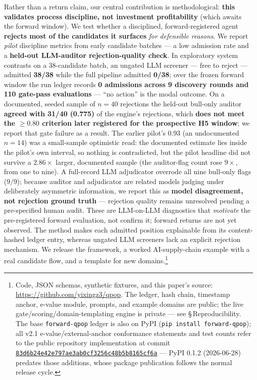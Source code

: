 \documentclass[11pt]{article}
\renewenvironment{abstract}{\begin{center}\bfseries\abstractname\end{center}\par\noindent\ignorespaces}{\par\medskip}
\begin{document}
\begin{abstract}
Rather than a return claim, our central contribution is methodological: \textbf{this validates
process discipline, not investment profitability} (which awaits the forward window). We test whether
a disciplined, forward-registered agent \textbf{rejects most of the candidates it surfaces}
\emph{for defensible reasons}. We report \emph{pilot} discipline metrics from early candidate batches
--- a low admission rate and a \textbf{held-out LLM-auditor rejection-quality check}. In exploratory
system contrasts on a 38-candidate batch, an ungated LLM screener --- free to reject --- admitted
\textbf{38/38} while the full pipeline admitted \textbf{0/38}; over the frozen forward window the
run ledger records \textbf{0 admissions across 9 discovery rounds and 110 gate-pass evaluations}
--- ``no action'' is the modal outcome. On a documented,
seeded sample of $n{=}40$ rejections the held-out bull-only auditor \textbf{agreed with 31/40 (0.775)}
of the engine's rejections, which \textbf{does not meet the $\geq 0.80$ criterion later registered
for the prospective H5 window}; we report
that gate failure as a result. The earlier pilot's $0.93$ (an undocumented $n{=}14$) was a small-sample
optimistic read: the documented estimate lies inside the pilot's own interval, so nothing is
contradicted, but the pilot headline did not survive a $2.86\times$ larger, documented sample (the
auditor-flag count rose $9\times$, from one to nine). A full-record LLM adjudicator overrode all nine
bull-only flags ($9/9$); because auditor and adjudicator are related models judging under deliberately
asymmetric information, we report this as \textbf{model disagreement, not rejection ground truth} ---
rejection quality remains unresolved pending a pre-specified human audit. These are LLM-on-LLM
diagnostics that \emph{motivate} the pre-registered forward evaluation, not
confirm it; forward returns are not yet observed. The method makes each admitted position
explainable from its content-hashed ledger entry, whereas ungated LLM screeners lack an
explicit rejection mechanism. We release the framework, a worked AI-supply-chain example with a real
candidate flow, and a template for new domains.\footnote{Code, JSON schemas, synthetic fixtures, and
this paper's source: \url{https://github.com/yixingz3/qpop}. The ledger, hash chain, timestamp anchor,
e-value module, prompts, and example domains are public; the live gate/scoring/domain-templating
engine is private --- see \S\,Reproducibility. The base \texttt{forward-qpop} ledger is also
on PyPI (\texttt{pip install forward-qpop}); all v2.1 e-value/external-anchor conformance
statements and test counts refer to the public repository implementation at commit
\href{https://github.com/yixingz3/qpop/commit/83d6b24e42e797ae3ab0cf3256c48b5b8165cf6a}{\texttt{83d6b24e42e797ae3ab0cf3256c48b5b8165cf6a}} --- PyPI 0.1.2 (2026-06-28) predates those
additions, whose package publication follows the normal release cycle.}
\end{abstract}
\end{document}
